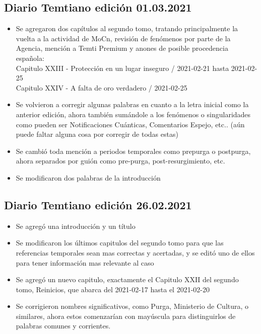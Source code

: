 \documentclass[
  spanish,
]{book}
\begin{document}
\hypertarget{diario-temtiano-ediciuxf3n-01.03.2021}{%
\subsection*{Diario Temtiano edición 01.03.2021}\label{diario-temtiano-ediciuxf3n-01.03.2021}}

\begin{itemize}
\item
  Se agregaron dos capítulos al segundo tomo, tratando principalmente la vuelta a la actividad de MoCn, revisión de fenómenos por parte de la Agencia, mención a Temti Premium y anones de posible procedencia española:~\\
  Capitulo XXIII - Protección en un lugar inseguro / 2021-02-21 hasta 2021-02-25~\\
  Capitulo XXIV - A falta de oro verdadero / 2021-02-25
\item
  Se volvieron a corregir algunas palabras en cuanto a la letra inicial como la anterior edición, ahora también sumándole a los fenómenos o singularidades como pueden ser Notificaciones Cuánticas, Comentarios Espejo, etc.. (aún puede faltar alguna cosa por corregir de todas estas)
\item
  Se cambió toda mención a periodos temporales como prepurga o postpurga, ahora separados por guión como pre-purga, post-resurgimiento, etc.
\item
  Se modificaron dos palabras de la introducción
\end{itemize}

\hypertarget{diario-temtiano-ediciuxf3n-26.02.2021}{%
\subsection*{Diario Temtiano edición 26.02.2021}\label{diario-temtiano-ediciuxf3n-26.02.2021}}

\begin{itemize}
\item
  Se agregó una introducción y un título
\item
  Se modificaron los últimos capitulos del segundo tomo para que las referencias temporales sean mas correctas y acertadas, y se editó uno de ellos para tener información mas relevante al caso
\item
  Se agregó un nuevo capitulo, exactamente el Capitulo XXII del segundo tomo, Reinicios, que abarca del 2021-02-17 hasta el 2021-02-20
\item
  Se corrigieron nombres significativos, como Purga, Ministerio de Cultura, o similares, ahora estos comenzarían con mayúscula para distinguirlos de palabras comunes y corrientes.
\end{itemize}
\end{document}
